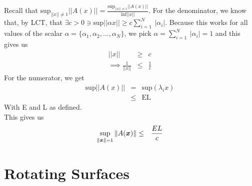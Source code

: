 \documentclass[11pt]{SelfArxOneColBMN}
\begin{document}
\begin{solution}
Recall that $\text{sup}_{||x|| \neq 1}||A(x)|| = \frac{\text{sup}_{||x|| \neq 1}||A(x)||}{\text{inf}||x||}$. For the denominator, we know that, by LCT, that $\exists c > 0 \ni \text{sup}||\alpha x|| \geq c\sum_{i=1}^N\:|\alpha_i|$. Because this works for all values of the scalar $\alpha = \{\alpha_1,\alpha_2,...,\alpha_N\}$, we pick $\alpha = \sum_{i=1}^N\:|\alpha_i| = 1$ and this gives us
\begin{eqnarray*}
  ||x|| &\geq& c\\
  \implies \frac{1}{||x||} &\leq& \frac{1}{c}
\end{eqnarray*}
For the numerator, we get 
\begin{eqnarray*}
  \text{sup}||A(x)|| &=& \text{sup}(\lambda_i x)\\
  &\leq& \text{EL}
\end{eqnarray*}
With E and L as defined.\\
This gives us
\begin{eqnarray*} \sup_{\|\boldsymbol{x}\| = 1} \|A(\boldsymbol{x})\|
  &\leq& 
  \frac{EL}{c}
\end{eqnarray*}
\end{solution}

\section{Rotating Surfaces}
\end{document}
